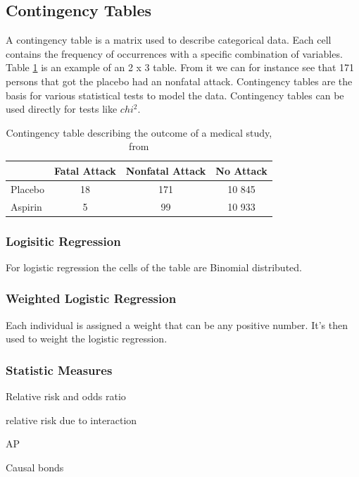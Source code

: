 \documentclass[10pt,a4paper]{report}
\begin{document}
\subsection{Contingency Tables}
A contingency table is a matrix used to describe categorical data. Each cell contains the frequency of occurrences with a specific combination of variables. Table \ref{table:contingency_table} is an example of an 2 x 3 table. From it we can for instance see that 171 persons that got the placebo had an nonfatal attack. Contingency tables are the basis for various statistical tests to model the data. Contingency tables can be used directly for tests like $chi^2$.\cite{agresti_categorical}

\begin{table}[h]
\begin{tabular}{ l c c c }
  \hline
  & Fatal Attack & Nonfatal Attack & No Attack\\
  \hline
  Placebo & 18 & 171 & 10 845 \\
  Aspirin & 5 & 99 & 10 933 \\
  \hline  
\end{tabular}
\caption{Contingency table describing the outcome of a medical study, from \cite{agresti_categorical}}
\label{table:contingency_table}
\end{table}

\subsubsection{Logisitic Regression}
For logistic regression the cells of the table are Binomial distributed.\cite{agresti_categorical}

\subsubsection{Weighted Logistic Regression}
Each individual is assigned a weight that can be any positive number. It's then used to weight the logistic regression.

\subsubsection{Statistic Measures}
Relative risk and odds ratio\cite{agresti_categorical}

relative risk due to interaction

AP

Causal bonds\cite{causal_bounds_arvid}

\end{document}
